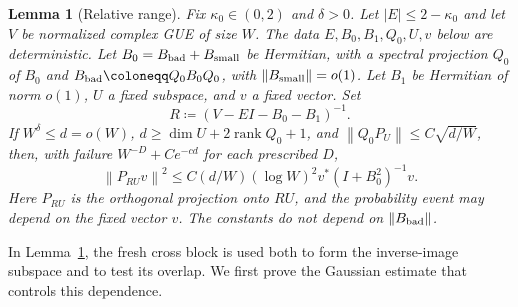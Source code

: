 \documentclass[11pt]{article}
\numberwithin{equation}{section}
\newtheorem{lemma}[theorem]{Lemma}
\theoremstyle{remark}
\newcommand{\rank}{\operatorname{rank}}
\newcommand{\norm}[1]{\left\|#1\right\|}
\begin{document}
\begin{lemma}[Relative range]\label{us:lem:range}
Fix $\kappa_0\in(0,2)$ and $\delta>0$. Let $|E|\le2-\kappa_0$ and
let $V$ be normalized complex GUE of size $W$. The data
$E,B_0,B_1,Q_0,U,v$ below are deterministic.
Let $B_0=B_{\rm bad}+B_{\rm small}$ be Hermitian, with a spectral projection $Q_0$ of $B_0$
and $B_{\rm bad}\coloneqq Q_0B_0Q_0$, with
$\norm{B_{\rm small}}=o(1)$. Let $B_1$ be Hermitian of norm $o(1)$,
$U$ a fixed subspace, and $v$ a fixed vector. Set
\[
 R\coloneqq (V-EI-B_0-B_1)^{-1}.
\]
If $W^\delta\le d=o(W)$, $d\ge\dim U+2\rank Q_0+1$, and
$\norm{Q_0P_U}\le C\sqrt{d/W}$, then, with failure
$W^{-D}+Ce^{-cd}$ for each prescribed $D$,
\begin{equation}
 \norm{P_{RU}v}^2\le C(d/W)(\log W)^2 v^*(I+B_0^2)^{-1}v.
 \label{us:eq:relative}
\end{equation}
Here $P_{RU}$ is the orthogonal projection onto $RU$, and the
probability event may depend on the fixed vector $v$.
The constants do not depend on $\norm{B_{\rm bad}}$.
\end{lemma}

In Lemma~\ref{us:lem:range}, the fresh cross block is used both to
form the inverse-image subspace and to test its overlap. We first
prove the Gaussian estimate that controls this dependence.
\end{document}

